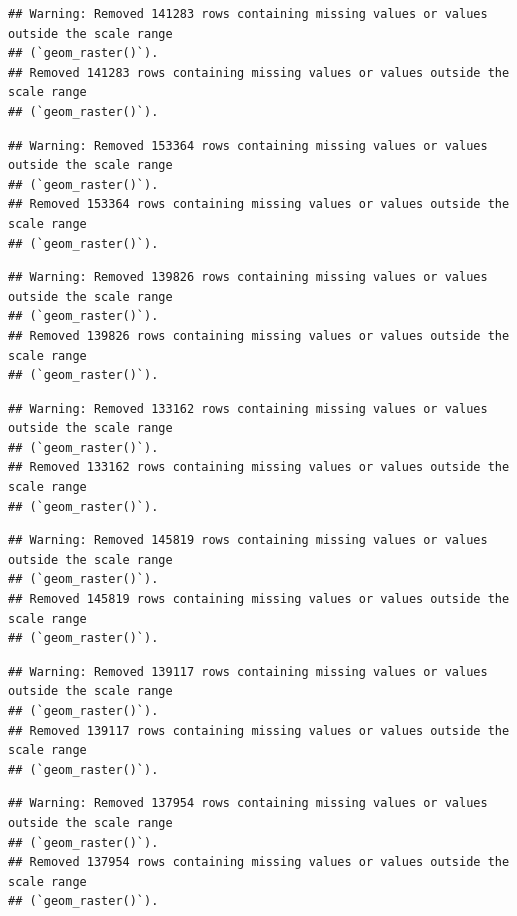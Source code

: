 \documentclass[
]{article}
\begin{document}
\begin{verbatim}
## Warning: Removed 141283 rows containing missing values or values outside the scale range
## (`geom_raster()`).
## Removed 141283 rows containing missing values or values outside the scale range
## (`geom_raster()`).
\end{verbatim}

\begin{verbatim}
## Warning: Removed 153364 rows containing missing values or values outside the scale range
## (`geom_raster()`).
## Removed 153364 rows containing missing values or values outside the scale range
## (`geom_raster()`).
\end{verbatim}

\begin{verbatim}
## Warning: Removed 139826 rows containing missing values or values outside the scale range
## (`geom_raster()`).
## Removed 139826 rows containing missing values or values outside the scale range
## (`geom_raster()`).
\end{verbatim}

\begin{verbatim}
## Warning: Removed 133162 rows containing missing values or values outside the scale range
## (`geom_raster()`).
## Removed 133162 rows containing missing values or values outside the scale range
## (`geom_raster()`).
\end{verbatim}

\begin{verbatim}
## Warning: Removed 145819 rows containing missing values or values outside the scale range
## (`geom_raster()`).
## Removed 145819 rows containing missing values or values outside the scale range
## (`geom_raster()`).
\end{verbatim}

\begin{verbatim}
## Warning: Removed 139117 rows containing missing values or values outside the scale range
## (`geom_raster()`).
## Removed 139117 rows containing missing values or values outside the scale range
## (`geom_raster()`).
\end{verbatim}

\begin{verbatim}
## Warning: Removed 137954 rows containing missing values or values outside the scale range
## (`geom_raster()`).
## Removed 137954 rows containing missing values or values outside the scale range
## (`geom_raster()`).
\end{verbatim}
\end{document}
